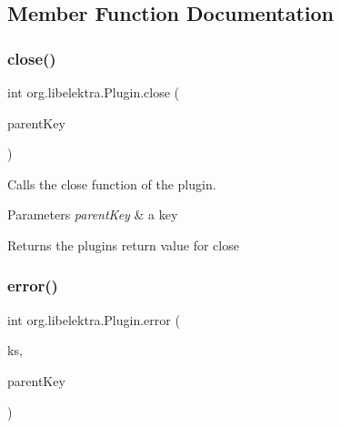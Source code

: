 \subsection{Member Function Documentation}
\mbox{\label{interfaceorg_1_1libelektra_1_1Plugin_aa5d4abf6ffd0d477d6972b13bed05d41}} 
\subsubsection{\texorpdfstring{close()}{close()}}
{\footnotesize\ttfamily int org.\+libelektra.\+Plugin.\+close (\begin{DoxyParamCaption}\item[{\hyperlink{classorg_1_1libelektra_1_1Key}{Key}}]{parent\+Key }\end{DoxyParamCaption})}



Calls the close function of the plugin. 


\begin{DoxyParams}{Parameters}
{\em parent\+Key} & a key \\
\hline
\end{DoxyParams}
\begin{DoxyReturn}{Returns}
the plugin\textquotesingle{}s return value for close 
\end{DoxyReturn}
\mbox{\label{interfaceorg_1_1libelektra_1_1Plugin_aa91370570c862ebe9eb83094a4731b9a}} 
\subsubsection{\texorpdfstring{error()}{error()}}
{\footnotesize\ttfamily int org.\+libelektra.\+Plugin.\+error (\begin{DoxyParamCaption}\item[{\hyperlink{classorg_1_1libelektra_1_1KeySet}{Key\+Set}}]{ks,  }\item[{\hyperlink{classorg_1_1libelektra_1_1Key}{Key}}]{parent\+Key }\end{DoxyParamCaption})}




